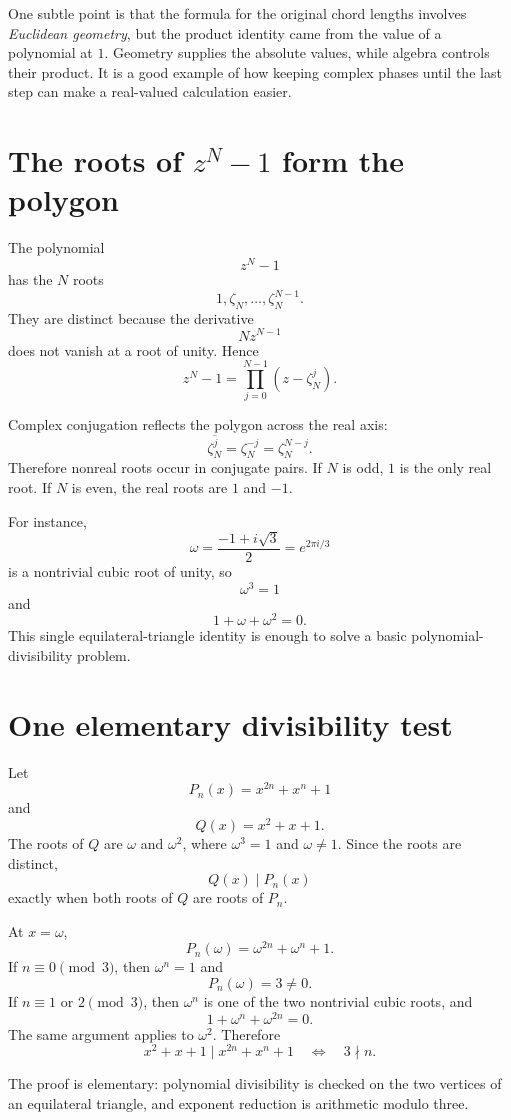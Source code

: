 One subtle point is that the formula for the original chord lengths involves \emph{Euclidean geometry}, but the product identity came from the value of a polynomial at $1$. Geometry supplies the absolute values, while algebra controls their product. It is a good example of how keeping complex phases until the last step can make a real-valued calculation easier.

\section{The roots of \texorpdfstring{$z^N-1$}{zN-1} form the polygon}

The polynomial
\[
  z^N-1
\]
has the \(N\) roots
\[
  1,\zeta_N,\ldots,\zeta_N^{N-1}.
\]
They are distinct because the derivative
\[
  Nz^{N-1}
\]
does not vanish at a root of unity.  Hence
\[
  z^N-1=\prod_{j=0}^{N-1}(z-\zeta_N^j).
\]

Complex conjugation reflects the polygon across the real axis:
\[
  \overline{\zeta_N^j}=\zeta_N^{-j}=\zeta_N^{N-j}.
\]
Therefore nonreal roots occur in conjugate pairs.  If \(N\) is odd, \(1\) is the only real root.  If \(N\) is even, the real roots are \(1\) and \(-1\).

For instance,
\[
  \omega=\frac{-1+i\sqrt3}{2}
  =e^{2\pi i/3}
\]
is a nontrivial cubic root of unity, so
\[
  \omega^3=1
\]
and
\[
  1+\omega+\omega^2=0.
\]
This single equilateral-triangle identity is enough to solve a basic polynomial-divisibility problem.

\section{One elementary divisibility test}

Let
\[
  P_n(x)=x^{2n}+x^n+1
\]
and
\[
  Q(x)=x^2+x+1.
\]
The roots of \(Q\) are \(\omega\) and \(\omega^2\), where \(\omega^3=1\) and \(\omega\neq1\).  Since the roots are distinct,
\[
  Q(x)\mid P_n(x)
\]
exactly when both roots of \(Q\) are roots of \(P_n\).

At \(x=\omega\),
\[
  P_n(\omega)=\omega^{2n}+\omega^n+1.
\]
If \(n\equiv0\pmod3\), then \(\omega^n=1\) and
\[
  P_n(\omega)=3\neq0.
\]
If \(n\equiv1\) or \(2\pmod3\), then \(\omega^n\) is one of the two nontrivial cubic roots, and
\[
  1+\omega^n+\omega^{2n}=0.
\]
The same argument applies to \(\omega^2\).  Therefore
\[
  \boxed{
  x^2+x+1\mid x^{2n}+x^n+1
  \quad\Longleftrightarrow\quad
  3\nmid n.}
\]

The proof is elementary: polynomial divisibility is checked on the two vertices of an equilateral triangle, and exponent reduction is arithmetic modulo three.

